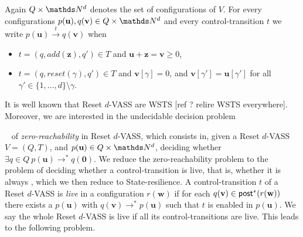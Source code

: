 Again $Q \times \N^d$
 denotes the set of configurations of $V$.
For every configurations $p(\textbf{u}), q(\textbf{v}) \in Q \times \N^d$ and every control-transition $t$ we write
$p(\textbf{u}) \xrightarrow{t} q(\textbf{v})$ when 

\begin{itemize}

\item  $t = (q,add(\textbf{z}),q') \in T$
and $\textbf{u}+\textbf{z} = \textbf{v} \geq 0$,

\item $t = (q,reset(\gamma),q') \in T$ 
and
$\textbf{v}[\gamma] = 0$, and $\textbf{v}[\gamma'] = \textbf{u}[\gamma']$ for all $\gamma' \in \{1,\ldots, d\} \setminus \gamma$.
\end{itemize}

\iffalse
\problemx{$d$-VASS zero-reachability}
{VASS $V=(Q,T)$, $p(\textbf{u}) \in Q \times \N^d$}
{$\exists q \in Q ~ p(\textbf{u}) \to^* q(\textbf{0})$? \\} 
\fi

It is well known that Reset $d$-VASS are WSTS [ref ? relire WSTS everywhere]. 
Moreover, we are interested in the 
 undecidable \cite{araki1976PN} decision problem%
\iffalse
\alain{ce qui suit est inutile}

\begin{samepage}
\problemx{Zero-reachability}
{A Reset $d$-VASS $V=(Q,T)$, $q(\textbf{u}) \in Q \times \N^d$}
{$\exists p \in Q ~ q(\textbf{u}) \to^* p(\textbf{0})$? \\}
\end{samepage}
%
\alain{ce qui précède est inutile}
\fi
~ of {\em zero-reachability} in Reset $d$-VASS, which consists in, given a
Reset $d$-VASS $V=(Q,T)$, and $p(\textbf{u}) \in Q \times \N^d$,
deciding whether $\exists q \in Q ~ p(\textbf{u}) \to^* q(\textbf{0})$.
%
We reduce the zero-reachability problem to the problem of deciding whether a control-transition is live, that is, whether it is always ,
which we then reduce to {\sc State-resilience}.
A control-transition $t$ of a Reset $d$-VASS is {\em live} in a configuration $r(\textbf{w})$ if for each $q(\textbf{v}) \in \textsf{post}^*(r(\textbf{w}))$ there exists a 
 $p(\textbf{u})$ with $q(\textbf{v}) \to^* p(\textbf{u})$ such that $t$ is enabled in $p(\textbf{u})$. We say the whole Reset $d$-VASS is live if all its control-transitions are
live. This leads to the following problem.

